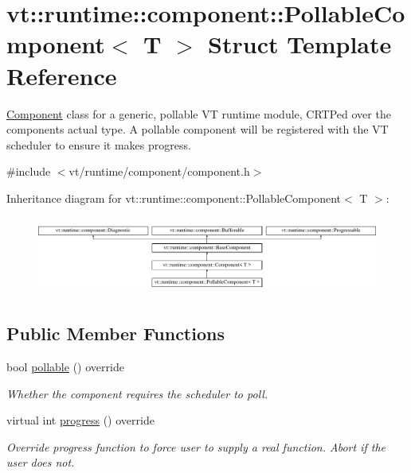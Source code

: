 \hypertarget{structvt_1_1runtime_1_1component_1_1_pollable_component}{}\section{vt\+:\+:runtime\+:\+:component\+:\+:Pollable\+Component$<$ T $>$ Struct Template Reference}
\label{structvt_1_1runtime_1_1component_1_1_pollable_component}


{\ttfamily \hyperlink{structvt_1_1runtime_1_1component_1_1_component}{Component}} class for a generic, pollable VT runtime module, C\+R\+TP\textquotesingle{}ed over the component\textquotesingle{}s actual type. A pollable component will be registered with the VT scheduler to ensure it makes progress.  




{\ttfamily \#include $<$vt/runtime/component/component.\+h$>$}

Inheritance diagram for vt\+:\+:runtime\+:\+:component\+:\+:Pollable\+Component$<$ T $>$\+:\begin{figure}[H]
\begin{center}
\leavevmode
\includegraphics[height=2.583622cm]{structvt_1_1runtime_1_1component_1_1_pollable_component}
\end{center}
\end{figure}
\subsection*{Public Member Functions}
\begin{DoxyCompactItemize}
\item 
bool \hyperlink{structvt_1_1runtime_1_1component_1_1_pollable_component_a8ad6cfbc184ed9862cae5304605fe025}{pollable} () override
\begin{DoxyCompactList}\small\item\em Whether the component requires the scheduler to poll. \end{DoxyCompactList}\item 
virtual int \hyperlink{structvt_1_1runtime_1_1component_1_1_pollable_component_a34cad810026224d550cd9b0c9d1eff22}{progress} () override
\begin{DoxyCompactList}\small\item\em Override progress function to force user to supply a real function. Abort if the user does not. \end{DoxyCompactList}\end{DoxyCompactItemize}
